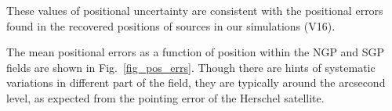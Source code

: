 \documentclass[useAMS,usenatbib]{mn2e}
\begin{document}
These values of positional uncertainty are consistent with the
positional errors found in the recovered positions of sources in our
simulations (V16). 




The mean positional errors as a function of position within the NGP
and SGP fields are shown in Fig.~\ref{fig_pos_errs}. Though there are
hints of systematic variations in different part of the field, they
are typically around the arcsecond level, as expected from the
pointing error of the Herschel satellite. 
\end{document}

